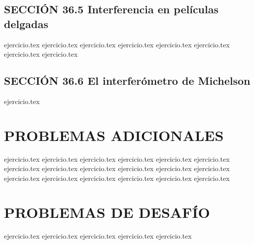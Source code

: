 \subsection*{SECCIÓN 36.5 Interferencia en películas delgadas}
\begin{enumerate}
    \setcounter{enumi}{18}
    {ejercicio.tex}
    {ejercicio.tex}
    {ejercicio.tex}
    {ejercicio.tex}
    {ejercicio.tex}
    {ejercicio.tex}
    {ejercicio.tex}
    {ejercicio.tex}
\end{enumerate}

\subsection*{SECCIÓN 36.6 El interferómetro de Michelson}
\begin{enumerate}
    \setcounter{enumi}{26}
    {ejercicio.tex}
\end{enumerate}

\section*{PROBLEMAS ADICIONALES}
\begin{enumerate}
    \setcounter{enumi}{27}
    {ejercicio.tex}
    {ejercicio.tex}
    {ejercicio.tex}
    {ejercicio.tex}
    {ejercicio.tex}
    {ejercicio.tex}
    {ejercicio.tex}
    {ejercicio.tex}
    {ejercicio.tex}
    {ejercicio.tex}
    {ejercicio.tex}
    {ejercicio.tex}
    {ejercicio.tex}
    {ejercicio.tex}
    {ejercicio.tex}
    {ejercicio.tex}
    {ejercicio.tex}
    {ejercicio.tex}
\end{enumerate}

\section*{PROBLEMAS DE DESAFÍO}
\begin{enumerate}
    \setcounter{enumi}{45}
    {ejercicio.tex}
    {ejercicio.tex}
    {ejercicio.tex}
    {ejercicio.tex}
    {ejercicio.tex}
\end{enumerate}
